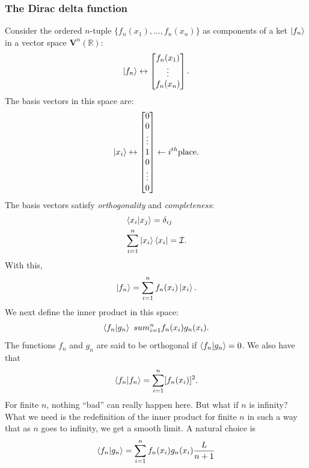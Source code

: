 \documentclass{book}
\theoremstyle{definition}
\newcommand{\f}[2]{\frac{#1}{#2}}
\newcommand{\V}{\mathbf{V}}
\newcommand{\Id}{\mathcal{I}}
\begin{document}
\subsubsection{The Dirac delta function}
Consider the ordered $n$-tuple $\{ f_n(x_1), \dots, f_n(x_n) \}$ as components of a ket $\ket{f_n}$ in a vector space $\V^n(\mathbb{R})$:
\begin{align}
\ket{f_n} \leftrightarrow \begin{bmatrix}
f_n(x_1) \\ \vdots \\ f_n(x_n)
\end{bmatrix}.
\end{align}
The basis vectors in this space are:
\begin{align}
\ket{x_i} \leftrightarrow \begin{bmatrix}
0 \\ 0 \\ \vdots \\ 1 \\ 0 \\ \vdots \\ 0
\end{bmatrix} \leftarrow i^{th} \text{place}.
\end{align}
The basis vectors satisfy \textit{orthogonality} and \textit{completeness}:
\begin{align}
&\braket{x_i}{x_j} = \delta_{ij}\\
&\sum_{i=1}^n \ket{x_i}\bra{x_i} = \Id.
\end{align}
With this,
\begin{align}
\ket{f_n} = \sum_{i=1}^n f_n(x_i)\ket{x_i}.
\end{align}
We next define the inner product in this space:
\begin{align}
\braket{f_n}{g_n} \ sum^n_{i=1}f_n(x_i)g_n(x_i).
\end{align}
The functions $f_n$ and $g_n$ are said to be orthogonal if $\braket{f_n}{g_n} = 0$. We also have that
\begin{align}
\braket{f_n}{f_n} = \sum^n_{i=1}[f_n(x_i)]^2.
\end{align}
For finite $n$, nothing ``bad'' can really happen here. But what if $n$ is infinity? What we need is the redefinition of the inner product for finite $n$ in such a way that as $n$ goes to infinity, we get a smooth limit. A natural choice is
\begin{align}
\braket{f_n}{g_n} = \sum^n_{i=1} f_n(x_i)g_n(x_i)\f{L}{n+1}
\end{align}
\end{document}
